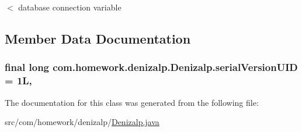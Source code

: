 $<$ database connection variable 

\subsection{Member Data Documentation}
\subsubsection[{\texorpdfstring{serial\+Version\+U\+ID}{serialVersionUID}}]{\setlength{\rightskip}{0pt plus 5cm}final long com.\+homework.\+denizalp.\+Denizalp.\+serial\+Version\+U\+ID = 1L\hspace{0.3cm}{\ttfamily [static]}, {\ttfamily [private]}}\hypertarget{classcom_1_1homework_1_1denizalp_1_1_denizalp_a0ba32279227f2b418ea1da8996859de8}{}\label{classcom_1_1homework_1_1denizalp_1_1_denizalp_a0ba32279227f2b418ea1da8996859de8}


The documentation for this class was generated from the following file\+:\begin{DoxyCompactItemize}
\item 
src/com/homework/denizalp/\hyperlink{_denizalp_8java}{Denizalp.\+java}\end{DoxyCompactItemize}
